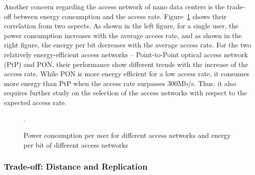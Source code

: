 Another concern regarding the access network of nano data centers is the trade-off between energy consumption and the access rate.  
Figure~\ref{fig:accessNet2} shows their correlation from two aspects.
As shown in the left figure,
for a single user,
the power consumption increases with the average access rate,
and as shown in the right figure, 
the energy per bit decreases with the average access rate.
For the two relatively energy-efficient access networks -- Point-to-Point optical access network (PtP) and PON,
their performance show different trends with the increase of the access rate.
While PON is more energy efficient for a low access rate,
it consumes more energy than PtP when the access rate surpasses 300Mb/s.
Thus, it also requires further study on the selection of the access networks with respect to the expected access rate.

\begin{figure}[h]
	\fontsize{12}{12} \selectfont
	\centerline{}
	\caption{Power consumption per user for different access networks and energy per bit of different access networks~\cite{accessNetwork}}.
	\label{fig:accessNet2}
	\normalsize
\end{figure}

\subsubsection{Trade-off: Distance and Replication}

